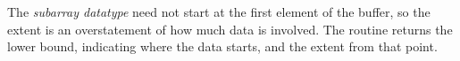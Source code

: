 The \emph{subarray datatype} need not
start at the first element of the buffer, so the extent is an
overstatement of how much data is involved. The routine
 returns the lower bound,
indicating where the data starts, and the extent from that point.
%

\begin{comment}
  Suppose we implement gather (see also Section Gather ) as a spanning
  tree implemented on top of point-to-point routines. Since the receive
  buffer is only valid on the root process, one will need to allocate
  some temporary space for receiving data on intermediate
  nodes. However, the datatype extent cannot be used as an estimate of
  the amount of space that needs to be allocated, if the user has
  modified the extent, for example by using MPI_TYPE_CREATE_RESIZED. The
  functions MPI_TYPE_GET_TRUE_EXTENT and MPI_TYPE_GET_TRUE_EXTENT_X are
  provided which return the true extent of the datatype.
\end{comment}

